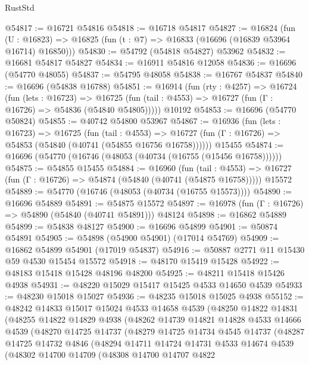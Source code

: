 \begin{lexlean}{RustStd}
\begin{coremodule}
@54817 := @16721 @54816
@54818 := @16718 @54817
@54827 := @16824
    (fun (U : @16823) => @16825 (fun (t : @7) => @16833 (@16696 (@16839 @53964 @16714) @16850)))
@54830 := @54792 (@54818 @54827) @53962
@54832 := @16681 @54817 @54827
@54834 := @16911 @54816 @12058
@54836 := @16696 (@54770 @48055)
@54837 := @54795 @48058
@54838 := @16767 @54837
@54840 := @16696 (@54838 @16788)
@54851 := @16914
    (fun (rty : @4257) =>
    @16724
      (fun (lets : @16723) =>
      @16725 (fun (tail : @4553) => @16727 (fun (Γ : @16726) => @54836 (@54840 @54805)))))
    @10192
@54853 := @16696 (@54770 @50824)
@54855 := @40742 @54800 @53967
@54867 := @16936
    (fun (lets : @16723) =>
    @16725
      (fun (tail : @4553) =>
      @16727 (fun (Γ : @16726) => @54853 (@54840 (@40741 (@54855 @16756 @16758))))))
    @15455
@54874 := @16696 (@54770 (@16746 (@48053 (@40734 (@16755 (@15456 @16758))))))
@54875 := @54855 @15455
@54884 := @16960
    (fun (tail : @4553) => @16727 (fun (Γ : @16726) => @54874 (@54840 (@40741 (@54875 @16758)))))
    @15572
@54889 := @54770 (@16746 (@48053 (@40734 (@16755 @15573))))
@54890 := @16696 @54889
@54891 := @54875 @15572
@54897 := @16978 (fun (Γ : @16726) => @54890 (@54840 (@40741 @54891))) @48124
@54898 := @16862 @54889
@54899 := @54838 @48127
@54900 := @16696 @54899
@54901 := @50874 @54891
@54905 := @54898 (@54900 @54901) (@17014 @54769)
@54909 := @16862 @54899 @54901 (@17019 @54837)
@54916 := @50887 @2771 @11 @15430 @59 @4530 @15454 @15572
@54918 := @48170 @15419 @15428
@54922 := @48183 @15418 @15428 @48196 @48200
@54925 := @48211 @15418 @15426 @4938
@54931 := @48220 @15029 @15417 @15425 @4533 @14650 @4539
@54933 := @48230 @15018 @15027
@54936 := @48235 @15018 @15025 @4938
@55152 := @48242
    @14833
    @15017
    @15024
    @4533
    @14658
    @4539
    (@48250
      @14822
      @14831
      (@48255
        @14822
        @14829
        @4938
        (@48262
          @14739
          @14821
          @14828
          @4533
          @14666
          @4539
          (@48270
            @14725
            @14737
            (@48279
              @14725
              @14734
              @4545
              @14737
              (@48287
                @14725
                @14732
                @4846
                (@48294
                  @14711
                  @14724
                  @14731
                  @4533
                  @14674
                  @4539
                  (@48302
                    @14700
                    @14709
                    (@48308
                      @14700
                      @14707
                      @4822

\end{coremodule}
\end{lexlean}
